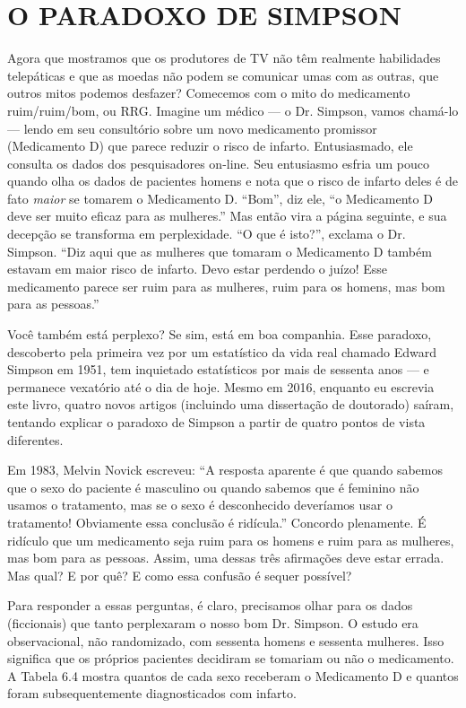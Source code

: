 \documentclass[11pt,a5paper,twoside]{book}
\begin{document}
\section{O PARADOXO DE SIMPSON}
Agora que mostramos que os produtores de TV não têm realmente habilidades telepáticas e que as moedas não podem se comunicar umas com as outras, que outros mitos podemos desfazer? Comecemos com o mito do medicamento ruim/ruim/bom, ou RRG. Imagine um médico — o Dr. Simpson, vamos chamá-lo — lendo em seu consultório sobre um novo medicamento promissor (Medicamento D) que parece reduzir o risco de infarto. Entusiasmado, ele consulta os dados dos pesquisadores on-line. Seu entusiasmo esfria um pouco quando olha os dados de pacientes homens e nota que o risco de infarto deles é de fato \textit{maior} se tomarem o Medicamento D. “Bom”, diz ele, “o Medicamento D deve ser muito eficaz para as mulheres.” Mas então vira a página seguinte, e sua decepção se transforma em perplexidade. “O que é isto?”, exclama o Dr. Simpson. “Diz aqui que as mulheres que tomaram o Medicamento D também estavam em maior risco de infarto. Devo estar perdendo o juízo! Esse medicamento parece ser ruim para as mulheres, ruim para os homens, mas bom para as pessoas.”

Você também está perplexo? Se sim, está em boa companhia. Esse paradoxo, descoberto pela primeira vez por um estatístico da vida real chamado Edward Simpson em 1951, tem inquietado estatísticos por mais de sessenta anos — e permanece vexatório até o dia de hoje. Mesmo em 2016, enquanto eu escrevia este livro, quatro novos artigos (incluindo uma dissertação de doutorado) saíram, tentando explicar o paradoxo de Simpson a partir de quatro pontos de vista diferentes.

Em 1983, Melvin Novick escreveu: “A resposta aparente é que quando sabemos que o sexo do paciente é masculino ou quando sabemos que é feminino não usamos o tratamento, mas se o sexo é desconhecido deveríamos usar o tratamento! Obviamente essa conclusão é ridícula.” Concordo plenamente. É ridículo que um medicamento seja ruim para os homens e ruim para as mulheres, mas bom para as pessoas. Assim, uma dessas três afirmações deve estar errada. Mas qual? E por quê? E como essa confusão é sequer possível?

Para responder a essas perguntas, é claro, precisamos olhar para os dados (ficcionais) que tanto perplexaram o nosso bom Dr. Simpson. O estudo era observacional, não randomizado, com sessenta homens e sessenta mulheres. Isso significa que os próprios pacientes decidiram se tomariam ou não o medicamento. A Tabela 6.4 mostra quantos de cada sexo receberam o Medicamento D e quantos foram subsequentemente diagnosticados com infarto.
\end{document}
